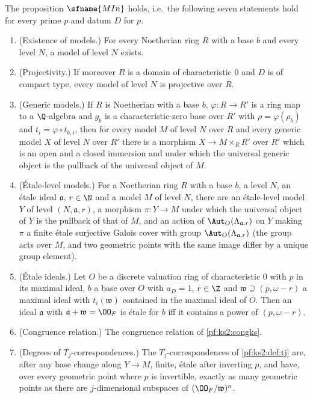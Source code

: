 \begin{theorem}\label{pf:ks2:min}
The proposition $\sfname{MIn}$ holds, i.e.\ the
following seven statements hold for every prime $p$ and datum $D$ for $p$.
\begin{enumerate}
\item (Existence of models.) For every Noetherian ring $R$ with a base $b$ and every level $N$,
  a model of level $N$ exists.
\item (Projectivity.) If moreover $R$ is a domain of characteristic $0$ and $D$ is of
  compact type, every model of level $N$ is projective over $R$.
\item (Generic models.) If $R$ is Noetherian with a base $b$, $\varphi\colon R\to R'$ is a ring
  map to a $\Q$-algebra and $g_b$ is a characteristic-zero base over $R'$ with $\rho=\varphi(\rho_b)$
  and $t_i=\varphi\circ t_{b,i}$, then for every model $M$ of level $N$ over $R$ and every generic
  model $X$ of level $N$ over $R'$ there is a morphism $X\to M\times_RR'$ over $R'$ which is an
  open and a closed immersion and under which the universal generic object is the pullback of the
  universal object of $M$.
\item (\'Etale-level models.) For a Noetherian ring $R$ with a base $b$, a level $N$, an \'etale ideal
  $\mathfrak a$, $r\in\N$ and a model $M$ of level $N$, there are an \'etale-level model $Y$ of
  level $(N,\mathfrak a,r)$, a morphism $\pi\colon Y\to M$ under which the universal object of $Y$
  is the pullback of that of $M$, and an action of $\Aut_O(\Lambda_{\mathfrak a,r})$ on $Y$ making
  $\pi$ a finite \'etale surjective Galois cover with group $\Aut_O(\Lambda_{\mathfrak a,r})$
  (the group acts over $M$, and two geometric points with
  the same image differ by a unique group element).
\item (\'Etale ideals.) Let $O$ be a discrete valuation ring of characteristic $0$ with $p$ in its
  maximal ideal, $b$ a base over $O$ with $a_D=1$, $r\in\Z$ and $\mathfrak w\supseteq(p,\omega-r)$ a
  maximal ideal with $t_i(\mathfrak w)$ contained in the maximal ideal of $O$. Then an ideal
  $\mathfrak a$ with $\mathfrak a+\mathfrak w=\kstwoOF$ is \'etale for $b$ iff it contains a power
  of $(p,\omega-r)$.
\item (Congruence relation.) The congruence relation of \cref{pf:ks2:congks}.
\item (Degrees of $T_j$-correspondences.) The $T_j$-correspondences of \cref{pf:ks2:def:tj} are, after any base
  change along $Y\to M$, finite, \'etale after inverting $p$, and have, over every geometric point
  where $p$ is invertible, exactly as many geometric points as there are $j$-dimensional subspaces
  of $(\kstwoOF/\mathfrak w)^n$.
\end{enumerate}
\end{theorem}


